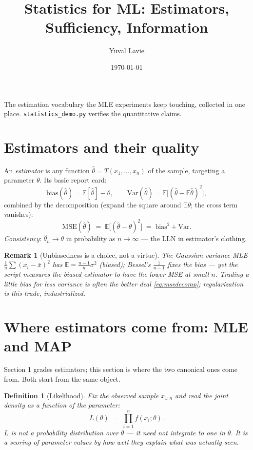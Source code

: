 \documentclass[11pt]{article}
\title{Statistics for ML: Estimators, Sufficiency, Information}
\author{Yuval Lavie}
\date{\today}
\newtheorem{definition}{Definition}
\newtheorem{remark}{Remark}
\begin{document}
\maketitle

\noindent
The estimation vocabulary the MLE experiments keep touching, collected in
one place. \texttt{statistics\_demo.py} verifies the quantitative claims.

\section{Estimators and their quality}

An \emph{estimator} is any function $\hat\theta = T(x_1,\dots,x_n)$ of the
sample, targeting a parameter $\theta$. Its basic report card:
\begin{equation}
  \mathrm{bias}(\hat\theta) = \mathbb{E}[\hat\theta] - \theta,
  \qquad
  \mathrm{Var}(\hat\theta) = \mathbb{E}\bigl[(\hat\theta -
  \mathbb{E}\hat\theta)^2\bigr],
\end{equation}
combined by the decomposition (expand the square around
$\mathbb{E}\hat\theta$; the cross term vanishes):
\begin{equation}
  \boxed{\;\mathrm{MSE}(\hat\theta)
  \;=\; \mathbb{E}\bigl[(\hat\theta-\theta)^2\bigr]
  \;=\; \mathrm{bias}^2 + \mathrm{Var} .\;}
  \label{eq:msedecomp}
\end{equation}
\emph{Consistency}: $\hat\theta_n \to \theta$ in probability as
$n\to\infty$ --- the LLN in estimator's clothing.

\begin{remark}[Unbiasedness is a choice, not a virtue]
The Gaussian variance MLE $\tfrac1n\sum(x_i-\bar x)^2$ has
$\mathbb{E} = \tfrac{n-1}{n}\sigma^2$ (biased); Bessel's
$\tfrac{1}{n-1}$ fixes the bias --- yet the script measures the
\emph{biased} estimator to have the lower MSE at small $n$. Trading a
little bias for less variance is often the better deal
\eqref{eq:msedecomp}; regularization is this trade, industrialized.
\end{remark}

\section{Where estimators come from: MLE and MAP}

Section 1 grades estimators; this section is where the two canonical
ones come from. Both start from the same object.

\begin{definition}[Likelihood]
Fix the observed sample $x_{1:n}$ and read the joint density as a
function of the \emph{parameter}:
\begin{equation}
  L(\theta) \;=\; \prod_{i=1}^{n} f(x_i;\theta).
  \label{eq:likelihood}
\end{equation}
$L$ is not a probability distribution over $\theta$ --- it need not
integrate to one in $\theta$. It is a scoring of parameter values by
how well they explain what was actually seen.
\end{definition}
\end{document}
